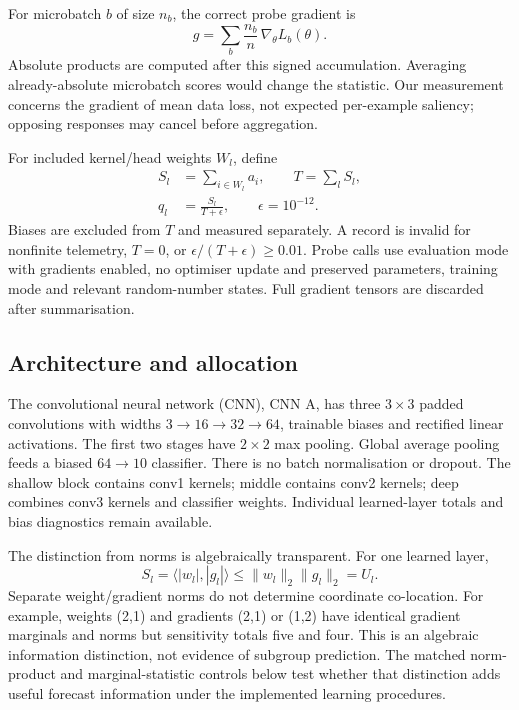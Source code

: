For microbatch $b$ of size $n_b$, the correct probe gradient is
\begin{equation}
g=\sum_b\frac{n_b}{n}\,\nabla_\theta L_b(\theta).
\label{eq:microbatch}
\tag{2}\end{equation}
Absolute products are computed after this signed accumulation. Averaging already-absolute microbatch scores would change the statistic. Our measurement concerns the gradient of mean data loss, not expected per-example saliency; opposing responses may cancel before aggregation.

For included kernel/head weights $W_l$, define
\begin{equation}
\begin{aligned}
S_l&=\sum_{i\in W_l}a_i,\qquad T=\sum_lS_l,\\
q_l&=\frac{S_l}{T+\epsilon},\qquad\epsilon=10^{-12}.
\end{aligned}
\label{eq:shares}
\tag{3}\end{equation}
Biases are excluded from $T$ and measured separately. A record is invalid for nonfinite telemetry, $T=0$, or $\epsilon/(T+\epsilon)\geq0.01$. Probe calls use evaluation mode with gradients enabled, no optimiser update and preserved parameters, training mode and relevant random-number states. Full gradient tensors are discarded after summarisation.

\subsection{Architecture and allocation}
The convolutional neural network (CNN), CNN A, has three $3\times3$ padded convolutions with widths $3\!\rightarrow\!16\!\rightarrow\!32\!\rightarrow\!64$, trainable biases and rectified linear activations. The first two stages have $2\times2$ max pooling. Global average pooling feeds a biased $64\!\rightarrow\!10$ classifier. There is no batch normalisation or dropout. The shallow block contains conv1 kernels; middle contains conv2 kernels; deep combines conv3 kernels and classifier weights. Individual learned-layer totals and bias diagnostics remain available.

The distinction from norms is algebraically transparent. For one learned layer,
\begin{equation}
S_l=\langle|w_l|,|g_l|\rangle
\leq\|w_l\|_2\|g_l\|_2=U_l.
\label{eq:norm}
\tag{4}\end{equation}
Separate weight/gradient norms do not determine coordinate co-location. For example, weights (2,1) and gradients (2,1) or (1,2) have identical gradient marginals and norms but sensitivity totals five and four. This is an algebraic information distinction, not evidence of subgroup prediction. The matched norm-product and marginal-statistic controls below test whether that distinction adds useful forecast information under the implemented learning procedures.



